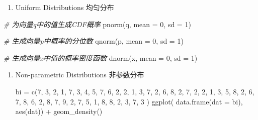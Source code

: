 \documentclass[
]{article}
\newenvironment{Shaded}{}{}
\newcommand{\AttributeTok}[1]{\textcolor[rgb]{0.49,0.56,0.16}{#1}}
\newcommand{\CommentTok}[1]{\textcolor[rgb]{0.38,0.63,0.69}{\textit{#1}}}
\newcommand{\DecValTok}[1]{\textcolor[rgb]{0.25,0.63,0.44}{#1}}
\newcommand{\FunctionTok}[1]{\textcolor[rgb]{0.02,0.16,0.49}{#1}}
\newcommand{\NormalTok}[1]{#1}
\newcommand{\OtherTok}[1]{\textcolor[rgb]{0.00,0.44,0.13}{#1}}
\newcommand{\SpecialCharTok}[1]{\textcolor[rgb]{0.25,0.44,0.63}{#1}}
\begin{document}
\begin{enumerate}
\def\labelenumi{\arabic{enumi}.}
\item
  Uniform Distributions 均匀分布
\end{enumerate}

\begin{Shaded}
\begin{Highlighting}[]
\CommentTok{\# 为向量q中的值生成CDF概率 }
\FunctionTok{pnorm}\NormalTok{(q, }\AttributeTok{mean =} \DecValTok{0}\NormalTok{, }\AttributeTok{sd =} \DecValTok{1}\NormalTok{)    }

\CommentTok{\# 生成向量p中概率的分位数}
\FunctionTok{qnorm}\NormalTok{(p, }\AttributeTok{mean =} \DecValTok{0}\NormalTok{, }\AttributeTok{sd =} \DecValTok{1}\NormalTok{)    }

\CommentTok{\# 生成向量x中值的概率密度函数}
\FunctionTok{dnorm}\NormalTok{(x, }\AttributeTok{mean =} \DecValTok{0}\NormalTok{, }\AttributeTok{sd =} \DecValTok{1}\NormalTok{)}
\end{Highlighting}
\end{Shaded}

\begin{enumerate}
\def\labelenumi{\arabic{enumi}.}
\item
  Non-parametric Distributions 非参数分布

\begin{Shaded}
\begin{Highlighting}[]
\NormalTok{bi }\OtherTok{=}
	\FunctionTok{c}\NormalTok{(}\DecValTok{7}\NormalTok{, }\DecValTok{3}\NormalTok{, }\DecValTok{2}\NormalTok{, }\DecValTok{1}\NormalTok{, }\DecValTok{7}\NormalTok{, }
    \DecValTok{3}\NormalTok{, }\DecValTok{4}\NormalTok{, }\DecValTok{5}\NormalTok{, }\DecValTok{7}\NormalTok{, }\DecValTok{6}\NormalTok{,}
    \DecValTok{2}\NormalTok{, }\DecValTok{2}\NormalTok{, }\DecValTok{1}\NormalTok{, }\DecValTok{3}\NormalTok{, }\DecValTok{7}\NormalTok{, }
    \DecValTok{2}\NormalTok{, }\DecValTok{6}\NormalTok{, }\DecValTok{8}\NormalTok{, }\DecValTok{2}\NormalTok{, }\DecValTok{7}\NormalTok{,}
    \DecValTok{2}\NormalTok{, }\DecValTok{2}\NormalTok{, }\DecValTok{1}\NormalTok{, }\DecValTok{3}\NormalTok{, }\DecValTok{5}\NormalTok{, }
    \DecValTok{8}\NormalTok{, }\DecValTok{2}\NormalTok{, }\DecValTok{6}\NormalTok{, }\DecValTok{7}\NormalTok{, }\DecValTok{8}\NormalTok{, }
    \DecValTok{6}\NormalTok{, }\DecValTok{2}\NormalTok{, }\DecValTok{8}\NormalTok{, }\DecValTok{7}\NormalTok{, }\DecValTok{9}\NormalTok{, }
    \DecValTok{2}\NormalTok{, }\DecValTok{7}\NormalTok{, }\DecValTok{5}\NormalTok{, }\DecValTok{1}\NormalTok{, }\DecValTok{8}\NormalTok{, }
    \DecValTok{8}\NormalTok{, }\DecValTok{2}\NormalTok{, }\DecValTok{3}\NormalTok{, }\DecValTok{7}\NormalTok{, }\DecValTok{3}
\NormalTok{   )}
\FunctionTok{ggplot}\NormalTok{( }
  \FunctionTok{data.frame}\NormalTok{(}\AttributeTok{dat =}\NormalTok{ bi),}
  \FunctionTok{aes}\NormalTok{(dat)) }\SpecialCharTok{+} 
\FunctionTok{geom\_density}\NormalTok{()}
\end{Highlighting}
\end{Shaded}
\end{enumerate}
\end{document}
